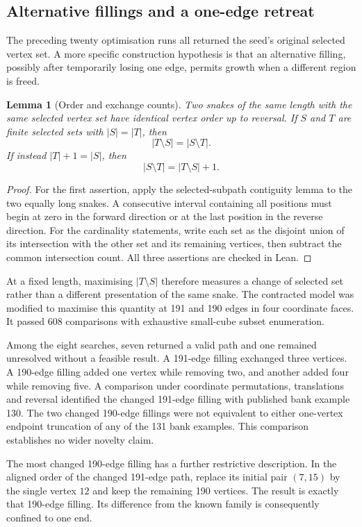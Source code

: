 \documentclass[11pt,a4paper]{article}
\newtheorem{lemma}[theorem]{Lemma}
\theoremstyle{definition}
\theoremstyle{remark}
\begin{document}
\subsection{Alternative fillings and a one-edge retreat}
The preceding twenty optimisation runs all returned the seed's original selected vertex set. A more specific construction hypothesis is that an alternative filling, possibly after temporarily losing one edge, permits growth when a different region is freed.

\begin{lemma}[Order and exchange counts]
Two snakes of the same length with the same selected vertex set have identical vertex order up to reversal. If $S$ and $T$ are finite selected sets with $|S|=|T|$, then
\[
|T\setminus S|=|S\setminus T|.
\]
If instead $|T|+1=|S|$, then
\[
|S\setminus T|=|T\setminus S|+1.
\]
\end{lemma}
\begin{proof}
For the first assertion, apply the selected-subpath contiguity lemma to the two equally long snakes. A consecutive interval containing all positions must begin at zero in the forward direction or at the last position in the reverse direction. For the cardinality statements, write each set as the disjoint union of its intersection with the other set and its remaining vertices, then subtract the common intersection count. All three assertions are checked in Lean.
\end{proof}

At a fixed length, maximising $|T\setminus S|$ therefore measures a change of selected set rather than a different presentation of the same snake. The contracted model was modified to maximise this quantity at 191 and 190 edges in four coordinate faces. It passed 608 comparisons with exhaustive small-cube subset enumeration.

Among the eight searches, seven returned a valid path and one remained unresolved without a feasible result. A 191-edge filling exchanged three vertices. A 190-edge filling added one vertex while removing two, and another added four while removing five. A comparison under coordinate permutations, translations and reversal identified the changed 191-edge filling with published bank example 130. The two changed 190-edge fillings were not equivalent to either one-vertex endpoint truncation of any of the 131 bank examples. This comparison establishes no wider novelty claim.

The most changed 190-edge filling has a further restrictive description. In the aligned order of the changed 191-edge path, replace its initial pair $(7,15)$ by the single vertex $12$ and keep the remaining 190 vertices. The result is exactly that 190-edge filling. Its difference from the known family is consequently confined to one end.
\end{document}
